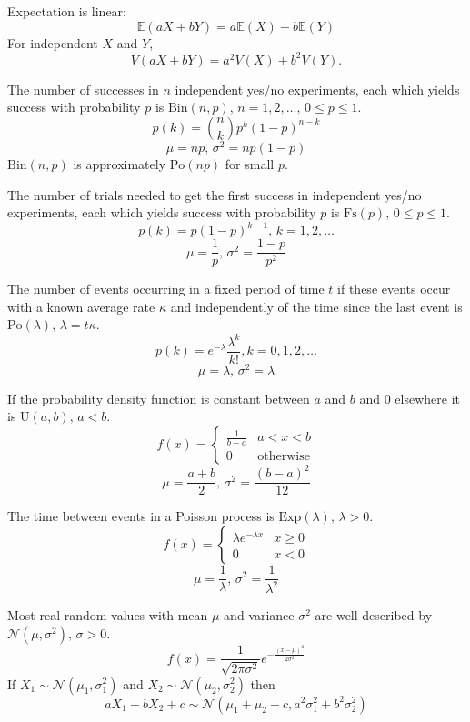 Expectation is linear:
\[\mathbb{E}(aX+bY) = a\mathbb{E}(X)+b\mathbb{E}(Y)\]
For independent $X$ and $Y$, \[V(aX+bY) = a^2V(X)+b^2V(Y).\]

\iffalse
{}

The number of successes in $n$ independent yes/no experiments, each which yields success with probability $p$ is $\textrm{Bin}(n,p),\,n=1,2,\dots,\, 0\leq p\leq1$.
\[p(k)=\binom{n}{k}p^k(1-p)^{n-k}\]
\[\mu = np,\,\sigma^2=np(1-p)\]
$\textrm{Bin}(n,p)$ is approximately $\textrm{Po}(np)$ for small $p$.

The number of trials needed to get the first success in independent yes/no experiments, each which yields success with probability $p$ is $\textrm{Fs}(p),\,0\leq p\leq1$.
\[p(k)=p(1-p)^{k-1},\,k=1,2,\dots\]
\[\mu = \frac1p,\,\sigma^2=\frac{1-p}{p^2}\]

The number of events occurring in a fixed period of time $t$ if these events occur with a known average rate $\kappa$ and independently of the time since the last event is $\textrm{Po}(\lambda),\,\lambda=t\kappa$.
\[p(k)=e^{-\lambda}\frac{\lambda^k}{k!}, k=0,1,2,\dots\]
\[\mu=\lambda,\,\sigma^2=\lambda\]


If the probability density function is constant between $a$ and $b$ and 0 elsewhere it is $\textrm{U}(a,b),\,a<b$.
\[f(x) = \left\{
\begin{array}{cl}
\frac{1}{b-a} & a<x<b\\
0 & \textrm{otherwise}
\end{array}\right.\]
\[\mu=\frac{a+b}{2},\,\sigma^2=\frac{(b-a)^2}{12}\]

The time between events in a Poisson process is $\textrm{Exp}(\lambda),\,\lambda>0$.
\[f(x) = \left\{
\begin{array}{cl}
\lambda e^{-\lambda x} & x\geq0\\
0 & x<0
\end{array}\right.\]
\[\mu=\frac{1}{\lambda},\,\sigma^2=\frac{1}{\lambda^2}\]

Most real random values with mean $\mu$ and variance $\sigma^2$ are well described by $\mathcal{N}(\mu,\sigma^2),\,\sigma>0$.
\[ f(x) = \frac{1}{\sqrt{2\pi\sigma^2}}e^{-\frac{(x-\mu)^2}{2\sigma^2}} \]
If $X_1 \sim \mathcal{N}(\mu_1,\sigma_1^2)$ and $X_2 \sim \mathcal{N}(\mu_2,\sigma_2^2)$ then
\[ aX_1 + bX_2 + c \sim \mathcal{N}(\mu_1+\mu_2+c,a^2\sigma_1^2+b^2\sigma_2^2) \]

